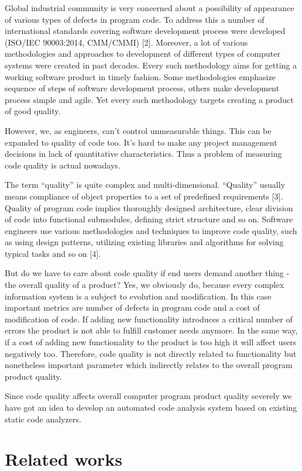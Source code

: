 \documentclass[runningheads,a4paper]{llncs}
\begin{document}
Global industrial community is very concerned about a possibility of appearance
of various types of defects in program code. To address this a number of
international standards covering software development process
were developed (ISO/IEC 90003:2014, CMM/CMMI) [2]. Moreover, a lot of
various methodologies and approaches to development of different types
of computer systems were created in past decades. Every such methodology aims
for getting a working software product in timely fashion. Some methodologies
emphasize sequence of steps of software development process, others make
development process simple and agile. Yet every such methodology targets
creating a product of good quality.

However, we, as engineers, can’t control unmeasurable things. This can be
expanded to quality of code too. It’s hard to make any project management
decisions in lack of quantitative characteristics. Thus a problem of measuring
code quality is actual nowadays.

The term “quality” is quite complex and multi-dimensional. “Quality” usually
means compliance of object properties to a set of predefined requirements [3].
Quality of program code implies thoroughly designed architecture, clear division
of code into functional submodules, defining strict structure and so on.
Software engineers use various methodologies and techniques to improve code
quality, such as using design patterns, utilizing existing libraries and
algorithms for solving typical tasks and so on [4].

But do we have to care about code quality if end users demand another
thing - the overall quality of a product? Yes, we obviously do, because every
complex information system is a subject to evolution and modification. In this
case important metrics are number of defects in program code and a cost of
modification of code. If adding new functionality introduces a critical number
of errors the product is not able to fulfill customer needs anymore. In the
same way, if a cost of adding new functionality to the product is too high
it will affect users negatively too. Therefore, code quality is not directly
related to functionality but nonetheless important parameter which indirectly
relates to the overall program product quality.

Since code quality affects overall computer program product quality severely
we have got an idea to develop an automated code analysis system based on
existing static code analyzers.

\section{Related works}
\end{document}
